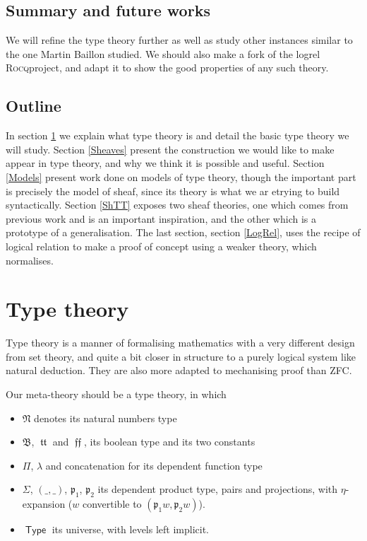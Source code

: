 \documentclass[11pt]{article}
\DeclareMathOperator{\Type}{\mathsf{Type}}
\DeclareMathOperator{\mtrue}{\mathfrak{tt}}
\DeclareMathOperator{\mfalse}{\mathfrak{ff}}
\newcommand{\0}{\mathbf{0}}
\newcommand{\1}{\mathbf{1}}
\newcommand{\mnat}{\mathfrak{N}}
\newcommand{\mbool}{\mathfrak{B}}
\newcommand{\rocq}{\textsc{Rocq}}
\begin{document}
\subsection*{Summary and future works}
We will refine the type theory further as well as study other instances similar to the one Martin Baillon studied.
We should also make a fork of the logrel \rocq project, and adapt it to show the good properties of any such theory.
\newpage
\tableofcontents
\newpage

\subsection*{Outline}

In section \ref{TT} we explain what type theory is and detail the basic type theory we will study. Section \ref{Sheaves} present the construction we would like to make appear in type theory, and why we think it is possible and useful. Section \ref{Models} present work done on models of type theory, though the important part is precisely the model of sheaf, since its theory is what we ar etrying to build syntactically. Section \ref{ShTT} exposes two sheaf theories, one which comes from previous work and is an important inspiration, and the other which is a prototype of a generalisation. The last section, section \ref{LogRel}, uses the recipe of logical relation to make a proof of concept using a weaker theory, which normalises.

\section{Type theory}\label{TT}

Type theory is a manner of formalising mathematics with a very different design from set theory, and quite a bit closer in structure to a purely logical system like natural deduction. They are also more adapted to mechanising proof than ZFC.

Our meta-theory should be a type theory, in which 
\begin{itemize}
    \item $\mnat$ denotes its natural numbers type
    \item $\mbool$, $\mtrue$ and $\mfalse$, its boolean type and its two constants
    \item $\Pi$, $\lambda$ and concatenation for its dependent function type
    \item $\Sigma$, $(\_,\_)$, $\mathfrak{p}_1$, $\mathfrak{p}_2$ its dependent product type, pairs and projections, with $\eta$-expansion ($w$ convertible to $(\mathfrak{p}_1 w, \mathfrak{p}_2 w)$).
    \item $\Type$ its universe, with levels left implicit.
\end{itemize}
\end{document}

